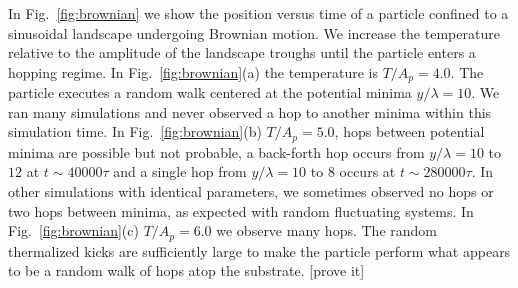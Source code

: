\documentclass[twocolumn,preprintnumbers,amsmath,amssymb,aps,prx]{revtex4}
\begin{document}
  In Fig.~\ref{fig:brownian}
  we show the position versus time of a particle
  confined to a sinusoidal landscape
  undergoing Brownian motion.
  We increase the temperature relative
  to the amplitude of the landscape
  troughs until the particle enters a hopping regime.
  In  Fig.~\ref{fig:brownian}(a)
  the temperature is $T/A_p = 4.0$.
  The particle executes a 
  random walk centered at the potential minima $y/\lambda = 10$.
  We ran many simulations and never observed a hop to another minima
  within this simulation time.  
  In  Fig.~\ref{fig:brownian}(b)
  $T/A_p = 5.0$,  hops between
  potential minima are possible but not probable,
  a back-forth hop occurs from
  $y/\lambda = 10$ to $12$ at
  $t \sim 40000 \tau$ and a single hop from 
  $y/\lambda = 10$ to $8$ occurs at
  $t \sim 280000 \tau$.
  In other simulations with identical parameters,
  we sometimes observed no hops or two hops between minima,
  as expected with random fluctuating systems.
  In  Fig.~\ref{fig:brownian}(c)
  $T/A_p = 6.0$ 
  we observe many hops.
  The random thermalized kicks are
  sufficiently large to make the particle perform
  what appears to be 
  a random walk of hops atop the substrate.
  [prove it]
  
\end{document}
